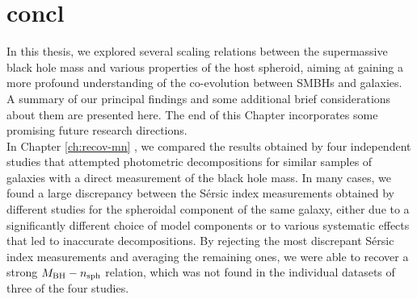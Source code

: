 \chapter{concl}
\label{ch:concl}

In this thesis, we explored several scaling relations between the supermassive black hole mass 
and various properties of the host spheroid, 
aiming at gaining a more profound understanding of the co-evolution between SMBHs and galaxies. 
A summary of our principal findings and some additional brief considerations about them are presented here. 
The end of this Chapter incorporates some promising future research directions. \\

In Chapter \ref{ch:recov-mn} \citep{savorgnan2013}, we compared the results obtained by four independent studies 
\citep{grahamdriver2007,sani2011,vika2012,beifiori2012}
that attempted photometric decompositions for similar samples of galaxies with a direct measurement 
of the black hole mass. 
In many cases, we found a large discrepancy between the S\'ersic index measurements 
obtained by different studies for the spheroidal component of the same galaxy, 
either due to a significantly different choice of model components 
or to various systematic effects that led to inaccurate decompositions. 
By rejecting the most discrepant S\'ersic index measurements and averaging the remaining ones, 
we were able to recover a strong $M_{\rm BH} - n_{\rm sph}$ relation, 
which was not found in the individual datasets of three of the four studies. 

